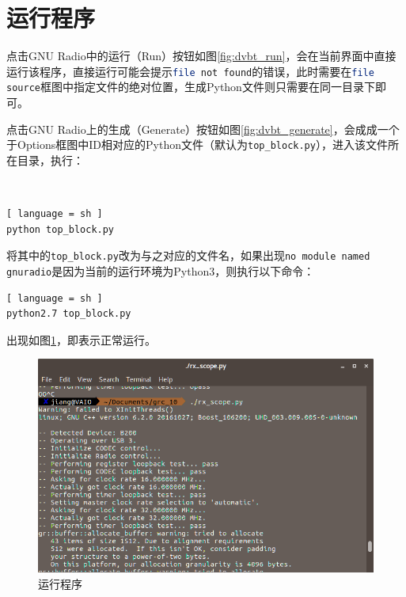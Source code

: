 	\section{运行程序}
		\par 点击GNU Radio中的运行（Run）按钮如图\ref{fig:dvbt_run}，会在当前界面中直接运行该程序，直接运行可能会提示\lstinline[language=sh]{file not found}的错误，此时需要在\lstinline[language=sh]{file source}框图中指定文件的绝对位置，生成Python文件则只需要在同一目录下即可。
		\par 点击GNU Radio上的生成（Generate）按钮如图\ref{fig:dvbt_generate}，会成成一个于Options框图中ID相对应的Python文件（默认为\lstinline[language=sh]{top_block.py}），进入该文件所在目录，执行：
		\begin{figure}[htp]
			\centering
			 \\
		\end{figure}
		\begin{lstlisting}[ language = sh ]
python top_block.py
		\end{lstlisting}
		\par 将其中的\lstinline[language=sh]{top_block.py}改为与之对应的文件名，如果出现\lstinline[language=sh]{no module named gnuradio}是因为当前的运行环境为Python3，则执行以下命令：
		\begin{lstlisting}[ language = sh ]
python2.7 top_block.py
		\end{lstlisting}
		\par 出现如图\ref{fig:dvbt_runtime}，即表示正常运行。
		\begin{figure}[htp]
			\centering
			\includegraphics[width=13cm]{figures/dvbt_runtime.png}
			\caption{运行程序}
			\label{fig:dvbt_runtime}
		\end{figure}
		
				
